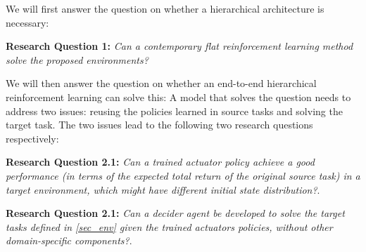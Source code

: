 We will first answer the question on whether a hierarchical architecture is necessary: 

\textbf{Research Question 1: }\textit{Can a contemporary flat reinforcement learning method solve the proposed environments?}


We will then answer the question on whether an end-to-end hierarchical reinforcement learning can solve this:
A model that solves the question needs to address two issues: reusing the policies learned in source tasks and solving the target task. The two issues lead to the following two research questions respectively:

\textbf{Research Question 2.1: }\textit{Can a trained actuator policy achieve a good performance (in terms of the expected total return of the original source task) in a target environment, which might have different initial state distribution?}.

\textbf{Research Question 2.1: }\textit{Can a decider agent be developed to solve the target tasks defined in \ref{sec_env} given the trained actuators policies, without other domain-specific components?}.
